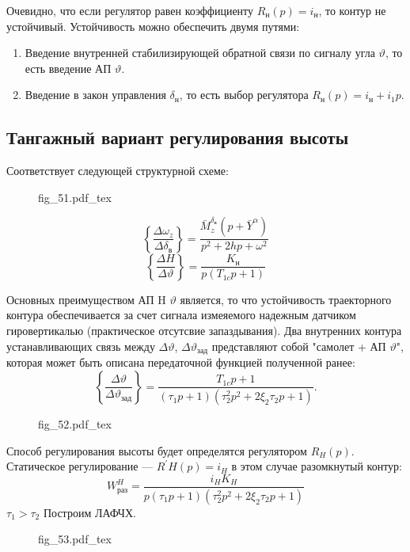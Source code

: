 \documentclass{article}
\newcommand{\incfig}[1]{
    {#1.pdf_tex}
}
\begin{document}
Очевидно, что если регулятор равен коэффициенту $R_\text{н}(p)  = i_\text{н}$, то контур не устойчивый.
Устойчивость можно обеспечить двумя путями:

\begin{enumerate}
	\item Введение внутренней стабилизирующей обратной связи по сигналу угла $\vartheta$, то есть введение АП $\vartheta$.
	\item Введение в закон управления $\delta_\text{н}$, то есть выбор регулятора $R_\text{н}(p) = i_\text{н} + i_1p$.
\end{enumerate}

\subsection{Тангажный вариант регулирования высоты}
Соответствует следующей структурной схеме:

\begin{figure}[H]
	\centering
	\incfig{fig_51}
	\label{fig:fig_51}
\end{figure}

\[
	\left\{\frac{\Delta \omega_z}{\Delta \delta_\text{в}} \right\} = \frac{\bar{M}_z^{\delta_\text{в}}(p + \bar{Y}^\alpha)}{p^2 + 2hp + \omega^2} 
\]
\[
	\left\{ \frac{\Delta H}{\Delta \vartheta} \right\} = \frac{K_\text{н}}{p(T_{1c}p +1)}
\]

Основных преимуществом АП H $\vartheta$ является, то что устойчивость траекторного контура обеспечивается за счет сигнала измеяемого надежным датчиком гировертикалью (практическое отсутсвие запаздывания). Два внутренних контура устанавливающих связь между $\Delta \vartheta$, $\Delta \vartheta_\text{зад}$ представляют собой "самолет + АП $\vartheta$", которая может быть описана передаточной функцией полученной ранее:
\[
	\left\{\frac{\Delta \vartheta}{\Delta \vartheta_\text{зад}} \right\} =\frac{T_{1c}p + 1}{(\tau_1 p + 1) (\tau_2^2p^2 + 2 \xi_2 \tau_2 p + 1)}.
\]
\begin{figure}[H]
	\centering
	\incfig{fig_52}
	\label{fig:fig_52}
\end{figure}
Способ регулирования высоты будет определятся регулятором $R_H(p)$.
Статическое регулирование --- $R^{'}H(p) = i_H$ в этом случае разомкнутый контур:
\[
	W_\text{раз}^H =\frac{i_H K_H}{p(\tau_1 p + 1)(\tau_2^2 p^2 + 2 \xi_2 \tau_2 p + 1)}
\]
$\tau_1 > \tau_2$
Построим ЛАФЧХ. 

\begin{figure}[H]
	\centering
	\incfig{fig_53}
	\label{fig:fig_53}
\end{figure}
\end{document}
